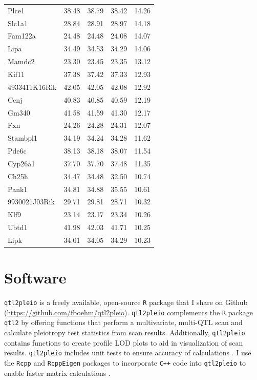 \documentclass[oneside]{book}\usepackage[]{graphicx}\usepackage[]{color}
\begin{document}
{\begin{longtable}{lrrrr}
  Plce1 & 38.48 & 38.79 & 38.42 & 14.26 \\
  Slc1a1 & 28.84 & 28.91 & 28.97 & 14.18 \\
  Fam122a & 24.48 & 24.48 & 24.08 & 14.07 \\
  Lipa & 34.49 & 34.53 & 34.29 & 14.06 \\
  Mamdc2 & 23.30 & 23.45 & 23.35 & 13.12 \\
  Kif11 & 37.38 & 37.42 & 37.33 & 12.93 \\
  4933411K16Rik & 42.05 & 42.05 & 42.08 & 12.92 \\
  Ccnj & 40.83 & 40.85 & 40.59 & 12.19 \\
  Gm340 & 41.58 & 41.59 & 41.30 & 12.17 \\
  Fxn & 24.26 & 24.28 & 24.31 & 12.07 \\
  Stambpl1 & 34.19 & 34.24 & 34.28 & 11.62 \\
  Pde6c & 38.13 & 38.18 & 38.07 & 11.54 \\
  Cyp26a1 & 37.70 & 37.70 & 37.48 & 11.35 \\
  Ch25h & 34.47 & 34.48 & 32.50 & 10.74 \\
  Pank1 & 34.81 & 34.88 & 35.55 & 10.61 \\
  9930021J03Rik & 29.71 & 29.81 & 28.71 & 10.32 \\
  Klf9 & 23.14 & 23.17 & 23.34 & 10.26 \\
  Ubtd1 & 41.98 & 42.03 & 41.71 & 10.25 \\
  Lipk & 34.01 & 34.05 & 34.29 & 10.23 \\
   \hline
\end{longtable}
}







\chapter{Software}

\texttt{qtl2pleio} is a freely available, open-source \texttt{R} \citep{r} package that I share on Github (\url{https://github.com/fboehm/qtl2pleio}). \texttt{qtl2pleio} complements the \texttt{R} package \texttt{qtl2} \citep{broman2019rqtl2} by offering functions that perform a multivariate, multi-QTL scan and calculate pleiotropy test statistics from scan results. Additionally, \texttt{qtl2pleio} contains functions to create profile LOD plots to aid in visualization of scan results. \texttt{qtl2pleio} includes unit tests to ensure accuracy of calculations \citep{wickham2011testthat}. I use the \texttt{Rcpp} and \texttt{RcppEigen} packages to incorporate \texttt{C++} code into \texttt{qtl2pleio} to enable faster matrix calculations \citep{eddelbuettel2011rcpp,bates2013fast}.
\end{document}
